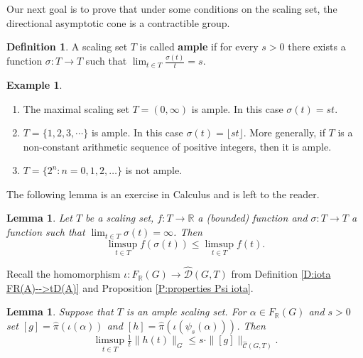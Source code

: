 \documentclass[12pt]{amsart}
\newtheorem{lemma}[prop]{Lemma}
\theoremstyle{definition}
\newtheorem{defn}[prop]{Definition}
\newtheorem{example}[prop]{Example}
\def\RR{\ensuremath{\mathbb{R}}}
\def\Free{F}
\def\D{\mathcal{D}}
\def\tC{\hat{\mathcal{C}}}
\def\tD{\hat{\D}}
\begin{document}
Our next goal is to prove that under some conditions on the scaling set, the directional asymptotic cone is a contractible group.


\begin{defn}\label{D:ample scaling set} %
A scaling set $T$ is called {\bf ample} if for every $s >0$ there exists a function $\sigma \colon T \to T$ such that $\lim_{t \in T} \tfrac{\sigma(t)}{t}=s$.
\end{defn}


\begin{example}\label{example:ample sets}
\begin{enumerate}[label=(\roman*),leftmargin=*]
\item The maximal scaling set $T=(0,\infty)$ is ample.
In this case $\sigma(t)=st$.
\item $T=\{1,2,3,\cdots\}$ is ample.
In this case $\sigma(t)=\lfloor st \rfloor$.
More generally, if $T$ is a non-constant arithmetic sequence of positive integers, then it is ample.
\item $T=\{ 2^n : n=0,1,2,\dots\}$ is not ample.
\end{enumerate}
\end{example}



The following lemma is an exercise in Calculus and is left to the reader.

\begin{lemma}\label{L:limsup domination}
Let $T$ be a scaling set, $f \colon T \to \RR$ a (bounded) function and $\sigma \colon T \to T$ a function such that $\lim_{t \in T} \sigma(t)=\infty$.
Then
\[
\limsup_{t \in T} f(\sigma(t)) \leq \limsup_{t \in T} f(t).
\]
\end{lemma}



Recall the homomorphism $\iota \colon \Free_\RR(G) \to \tD(G,T)$ from Definition \ref{D:iota FR(A)-->tD(A)} and Proposition \ref{P:properties Psi iota}.


\begin{lemma}\label{L:h-t preserves kerel limsup lemma}
Suppose that $T$ is an ample scaling set.
For $\alpha \in \Free_\RR(G)$ and $s >0$ set $[g]=\hat{\pi}(\iota(\alpha))$ and $[h]=\hat{\pi}(\iota(\psi_s(\alpha)))$.
Then
\[
\limsup_{t \in T} \tfrac{1}{t} \|h(t)\|_G \leq s \cdot \|[g]\|_{\tC(G,T)}.
\]
\end{lemma}
\end{document}
